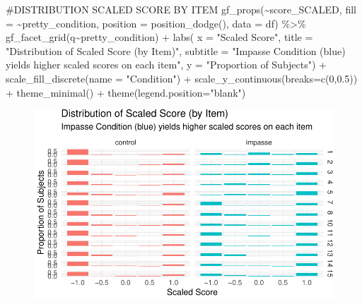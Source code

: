 \documentclass[
  letterpaper,
  DIV=11,
  numbers=noendperiod]{scrreprt}
\newenvironment{Shaded}{\begin{snugshade}}{\end{snugshade}}
\newcommand{\AttributeTok}[1]{\textcolor[rgb]{0.40,0.45,0.13}{#1}}
\newcommand{\CommentTok}[1]{\textcolor[rgb]{0.37,0.37,0.37}{#1}}
\newcommand{\DecValTok}[1]{\textcolor[rgb]{0.68,0.00,0.00}{#1}}
\newcommand{\FloatTok}[1]{\textcolor[rgb]{0.68,0.00,0.00}{#1}}
\newcommand{\FunctionTok}[1]{\textcolor[rgb]{0.28,0.35,0.67}{#1}}
\newcommand{\NormalTok}[1]{\textcolor[rgb]{0.00,0.23,0.31}{#1}}
\newcommand{\SpecialCharTok}[1]{\textcolor[rgb]{0.37,0.37,0.37}{#1}}
\newcommand{\StringTok}[1]{\textcolor[rgb]{0.13,0.47,0.30}{#1}}
\begin{document}
\begin{Shaded}
\begin{Highlighting}[]
\CommentTok{\#DISTRIBUTION SCALED SCORE BY ITEM}
\FunctionTok{gf\_props}\NormalTok{(}\SpecialCharTok{\textasciitilde{}}\NormalTok{score\_SCALED, }\AttributeTok{fill =} \SpecialCharTok{\textasciitilde{}}\NormalTok{pretty\_condition, }\AttributeTok{position =} \FunctionTok{position\_dodge}\NormalTok{(), }\AttributeTok{data =}\NormalTok{ df)  }\SpecialCharTok{\%\textgreater{}\%} 
  \FunctionTok{gf\_facet\_grid}\NormalTok{(q}\SpecialCharTok{\textasciitilde{}}\NormalTok{pretty\_condition) }\SpecialCharTok{+} 
  \FunctionTok{labs}\NormalTok{( }\AttributeTok{x =} \StringTok{"Scaled Score"}\NormalTok{, }
        \AttributeTok{title =} \StringTok{"Distribution of Scaled Score (by Item)"}\NormalTok{,}
        \AttributeTok{subtitle =} \StringTok{"Impasse Condition (blue) yields higher scaled scores on each item"}\NormalTok{,}
        \AttributeTok{y =} \StringTok{"Proportion of Subjects"}\NormalTok{) }\SpecialCharTok{+}
  \FunctionTok{scale\_fill\_discrete}\NormalTok{(}\AttributeTok{name =} \StringTok{"Condition"}\NormalTok{) }\SpecialCharTok{+}  \FunctionTok{scale\_y\_continuous}\NormalTok{(}\AttributeTok{breaks=}\FunctionTok{c}\NormalTok{(}\DecValTok{0}\NormalTok{,}\FloatTok{0.5}\NormalTok{)) }\SpecialCharTok{+} 
  \FunctionTok{theme\_minimal}\NormalTok{() }\SpecialCharTok{+} \FunctionTok{theme}\NormalTok{(}\AttributeTok{legend.position=}\StringTok{"blank"}\NormalTok{)}
\end{Highlighting}
\end{Shaded}

\begin{figure}[H]

{\centering \includegraphics{analysis/SGC3A/2_sgc3A_scoring_files/figure-pdf/DISTR-SCALEDSCORE-2.pdf}

}

\end{figure}
\end{document}
